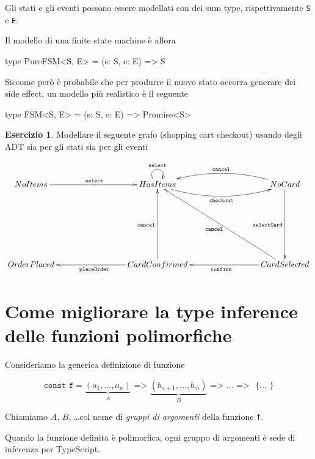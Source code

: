 \documentclass[12pt]{article}
\theoremstyle{definition}
\newtheorem{exercise}{Esercizio}[subsection]
\newenvironment{code}
  {\vspace{0.5cm} \VerbatimEnvironment\begin{typescriptcode}}
  {\end{typescriptcode} \vspace{0.2cm}}
\begin{document}
Gli stati e gli eventi possono essere modellati con dei sum type, rispettivamente \texttt{S} e \texttt{E}.

Il modello di una finite state machine è allora

\begin{code}
type PureFSM<S, E> = (s: S, e: E) => S
\end{code}

Siccome però è probabile che per produrre il nuovo stato occorra generare dei side effect, un modello più realistico è il seguente

\begin{code}
type FSM<S, E> = (s: S, e: E) => Promise<S>
\end{code}

\begin{exercise}
Modellare il seguente grafo (shopping cart checkout) usando degli ADT sia per gli stati sia per gli eventi

\[
\xymatrixrowsep{3cm}
\xymatrixcolsep{3cm}
\xymatrix{
  NoItems \ar[r]^{\texttt{select}} & HasItems \ar@(ul,ur)^{\texttt{select}} \ar@/_0.5cm/[r]_{\texttt{checkout}} & NoCard \ar[d]_{\texttt{selectCard}} \ar@/_0.5cm/[l]_{\texttt{cancel}} \\
  OrderPlaced & CardConfirmed \ar[u]^{\texttt{cancel}} \ar[l]^{\texttt{placeOrder}} & CardSelected \ar[ul]^{\texttt{cancel}} \ar[l]^{\texttt{confirm}} \\
}
\]
\end{exercise}

\newpage
\section{Come migliorare la type inference delle funzioni polimorfiche}

Consideriamo la generica definizione di funzione

$$
\texttt{const f} = \underbrace{(a_1, \ldots, a_n)}_A \texttt{ => } \underbrace{(b_{n + 1}, \ldots, b_m)}_B \texttt{ => } \ldots \texttt{ => } \texttt{ \{ } \ldots \texttt{ \} }
$$

Chiamiamo $A$, $B$, \ldots col nome di \emph{gruppi di argomenti} della funzione \texttt{f}.

Quando la funzione definita è polimorfica, ogni gruppo di argomenti è sede di inferenza per TypeScript.
\end{document}
